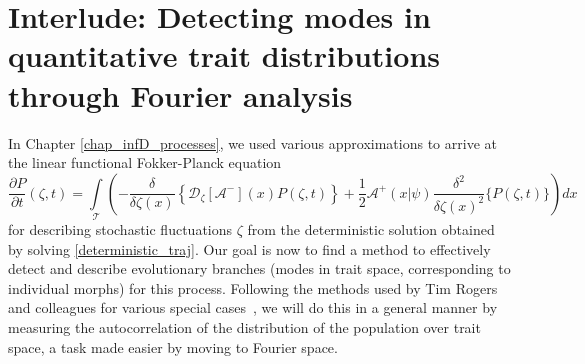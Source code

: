 \section{Interlude: Detecting modes in quantitative trait distributions through Fourier analysis}

In Chapter \ref{chap_infD_processes}, we used various approximations to arrive at the linear functional Fokker-Planck equation
\begin{equation}
\label{functional_WNE_for_App}
    \frac{\partial P}{\partial t}(\zeta,t) = \int\limits_{\mathcal{T}}\left(-\frac{\delta}{\delta \zeta(x)}\left\{\mathcal{D}_{\zeta}[\mathcal{A}^{-}](x)P(\zeta,t)\right\}+\frac{1}{2}\mathcal{A}^{+}(x|\psi)\frac{\delta^2}{\delta\zeta(x)^2}\{P(\zeta,t)\}\right)dx
\end{equation}
for describing stochastic fluctuations $\zeta$ from the deterministic solution obtained by solving \eqref{deterministic_traj}. Our goal is now to find a method to effectively detect and describe evolutionary branches (modes in trait space, corresponding to individual morphs) for this process. Following the methods used by Tim Rogers and colleagues for various special cases~\citep{rogers_demographic_2012, rogers_spontaneous_2012, rogers_modes_2015}, we will do this in a general manner by measuring the autocorrelation of the distribution of the population over trait space, a task made easier by moving to Fourier space.
